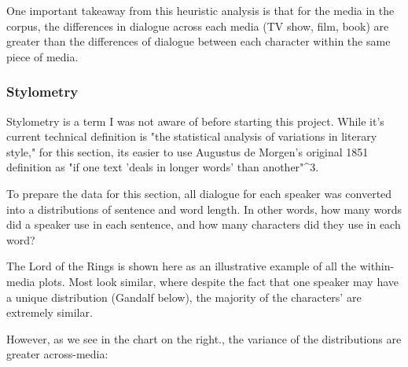 \documentclass{article}
\begin{document}
\begin{titlepage}
One important takeaway from this heuristic analysis is that for the media in the corpus, the differences in dialogue across each media (TV show, film, book) are greater than the differences of dialogue between each character within the same piece of media.

\subsubsection{Stylometry}

Stylometry is a term I was not aware of before starting this project. While it's current technical definition is "the statistical analysis of variations in literary style," for this section, its easier to use Augustus de Morgen's original 1851 definition as "if one text 'deals in longer words' than another"^3.

To prepare the data for this section, all dialogue for each speaker was converted into a distributions of sentence and word length. In other words, how many words did a speaker use in each sentence, and how many characters did they use in each word?

The Lord of the Rings is shown here as an illustrative example of all the within-media plots. Most look similar, where despite the fact that one speaker may have a unique distribution (Gandalf below), the majority of the characters' are extremely similar.

However, as we see in the chart on the right., the variance of the distributions are greater across-media:


\end{titlepage}
\end{document}
